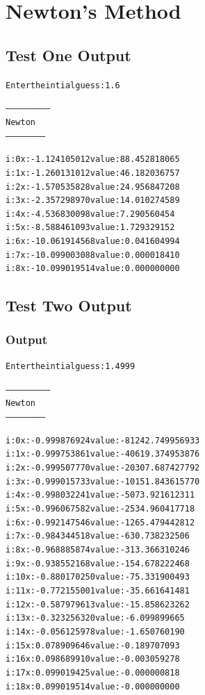 \documentclass[11pt]{article} %
\begin{document}
\section*{Newton's Method}

\subsection*{Test One Output}
\begin{alltt}
Enter the intial guess: 1.6

--------------------------
 Newton
 -----------------------


i: 0	x: -1.124105012	value: 88.452818065
i: 1	x: -1.260131012	value: 46.182036757
i: 2	x: -1.570535828	value: 24.956847208
i: 3	x: -2.357298970	value: 14.010274589
i: 4	x: -4.536830098	value: 7.290560454
i: 5	x: -8.588461093	value: 1.729329152
i: 6	x: -10.061914568	value: 0.041604994
i: 7	x: -10.099003088	value: 0.000018410
i: 8	x: -10.099019514	value: 0.000000000

\end{alltt}

\subsection*{Test Two Output}
\subsubsection*{Output}
\begin{alltt}
Enter the intial guess: 1.4999

--------------------------
 Newton
 -----------------------


i: 0	x: -0.999876924	value: -81242.749956933
i: 1	x: -0.999753861	value: -40619.374953876
i: 2	x: -0.999507770	value: -20307.687427792
i: 3	x: -0.999015733	value: -10151.843615770
i: 4	x: -0.998032241	value: -5073.921612311
i: 5	x: -0.996067582	value: -2534.960417718
i: 6	x: -0.992147546	value: -1265.479442812
i: 7	x: -0.984344518	value: -630.738232506
i: 8	x: -0.968885874	value: -313.366310246
i: 9	x: -0.938552168	value: -154.678222468
i: 10	x: -0.880170250	value: -75.331900493
i: 11	x: -0.772155001	value: -35.661641481
i: 12	x: -0.587979613	value: -15.858623262
i: 13	x: -0.323256320	value: -6.099899665
i: 14	x: -0.056125978	value: -1.650760190
i: 15	x: 0.078909646	value: -0.189707093
i: 16	x: 0.098689910	value: -0.003059278
i: 17	x: 0.099019425	value: -0.000000818
i: 18	x: 0.099019514	value: -0.000000000

\end{alltt}
\end{document}
